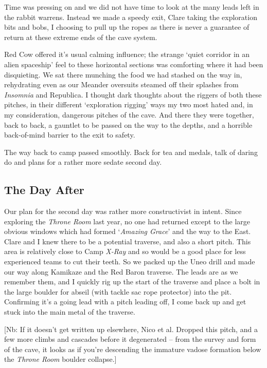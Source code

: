 Time was pressing on and we did not have time to look at the many leads
left in the rabbit warrens. Instead we made a speedy exit, Clare taking
the exploration bits and bobs, I choosing to pull up the ropes as there
is never a guarantee of return at these extreme ends of the cave system.

Red Cow offered it's usual calming influence; the strange `quiet
corridor in an alien spaceship' feel to these horizontal sections was
comforting where it had been disquieting. We sat there munching the food
we had stashed on the way in, rehydrating even as our Meander oversuits
steamed off their splashes from \emph{Insomnia} and Republica. I thought
dark thoughts about the riggers of both these pitches, in their
different `exploration rigging' ways my two most hated and, in my
consideration, dangerous pitches of the cave. And there they were
together, back to back, a gauntlet to be passed on the way to the
depths, and a horrible back-of-mind barrier to the exit to safety.

The way back to camp passed smoothly. Back for tea and medals, talk of
daring do and plans for a rather more sedate second day.


\subsection{The Day After}

Our plan for the second day was rather more constructivist in intent.
Since exploring the \emph{Throne Room} last year, no one had returned
except to the large obvious windows which had formed `\emph{Amazing
Grace}' and the way to the East. Clare and I knew there to be a
potential traverse, and also a short pitch. This area is relatively
close to Camp \emph{X-Ray} and so would be a good place for less
experienced teams to cut their teeth. So we packed up the Uneo drill and
made our way along Kamikaze and the Red Baron traverse. The leads are as
we remember them, and I quickly rig up the start of the traverse and
place a bolt in the large boulder for abseil (with tackle sac rope
protector) into the pit. Confirming it's a going lead with a pitch
leading off, I come back up and get stuck into the main metal of the
traverse.

{[}Nb: If it doesn't get written up elsewhere, Nico et al. Dropped this
pitch, and a few more climbs and cascades before it degenerated -- from
the survey and form of the cave, it looks as if you're descending the
immature vadose formation below the \emph{Throne Room} boulder
collapse.{]}

